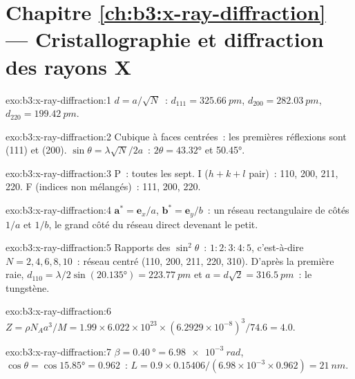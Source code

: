 \section*{Chapitre \ref{ch:b3:x-ray-diffraction} --- Cristallographie et diffraction des rayons X}

\begin{solution}{exo:b3:x-ray-diffraction:1}
$d = a/\sqrt N$~: $d_{111} = \qty{325.66}{pm}$, $d_{200} = \qty{282.03}{pm}$, $d_{220} =
\qty{199.42}{pm}$.
\end{solution}

\begin{solution}{exo:b3:x-ray-diffraction:2}
Cubique à faces centrées~: les premières réflexions sont (111) et (200).
$\sin\theta = \lambda\sqrt N/2a$~: $2\theta =
\ang{43.32}$ et \ang{50.45}.
\end{solution}

\begin{solution}{exo:b3:x-ray-diffraction:3}
P~: toutes les sept. I ($h + k + l$ pair)~: 110, 200, 211, 220. F (indices non mélangés)~: 111, 200, 220.
\end{solution}

\begin{solution}{exo:b3:x-ray-diffraction:4}
$\mathbf a^* = \mathbf e_x/a$, $\mathbf b^* = \mathbf e_y/b$~: un réseau
rectangulaire de côtés $1/a$
et $1/b$, le grand côté du réseau direct devenant le petit.
\end{solution}

\begin{solution}{exo:b3:x-ray-diffraction:5}
Rapports des $\sin^2\theta$~: $1 : 2 : 3 : 4 : 5$, c'est-à-dire
$N = 2, 4, 6, 8, 10$~: réseau centré (110,
200, 211, 220, 310). D'après la première raie, $d_{110} = \lambda/2\sin(\ang{20.135}) =
\qty{223.77}{pm}$ et $a = d\sqrt2 = \qty{316.5}{pm}$~: le tungstène.
\end{solution}

\begin{solution}{exo:b3:x-ray-diffraction:6}
$Z = \rho N_Aa^3/M = 1.99 \times 6.022\times10^{23} \times (6.2929\times10^{-8})^3/74.6 = 4.0$.
\end{solution}

\begin{solution}{exo:b3:x-ray-diffraction:7}
$\beta = \qty{0.40}{\degree} = \qty{6.98e-3}{rad}$, $\cos\theta = \cos\ang{15.85} = 0.962$~:
$L = 0.9 \times 0.15406/(6.98\times10^{-3} \times 0.962) = \qty{21}{nm}$.
\end{solution}

